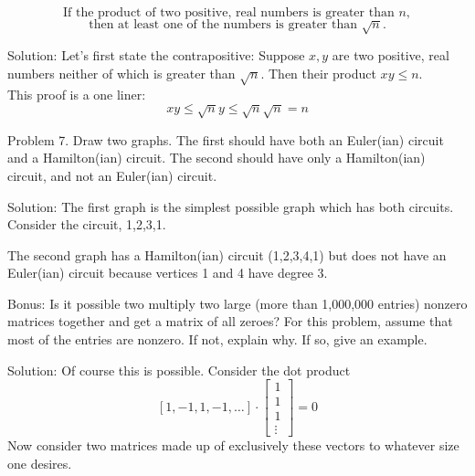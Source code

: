 \documentclass[16 pt]{amsart}
\theoremstyle{definition}
\theoremstyle{remark}
\numberwithin{equation}{subsection}
\begin{document}
\[
\text{If the product of two positive, real numbers is greater than } n,
\]
\[
\text{then at least one of the numbers is greater than } \sqrt{n}.
\]

\vspace{1in}

Solution: Let's first state the contrapositive: Suppose $x,y$ are two positive, real numbers neither of which is greater than $\sqrt{n}$.  Then their product $xy\le n$.\\

This proof is a one liner:
\[
xy \le \sqrt{n}y \le \sqrt{n}\sqrt{n} =n
\]



\newpage

Problem 7. Draw two graphs.  The first should have both an Euler(ian) circuit and a Hamilton(ian) circuit.  The second should have only a Hamilton(ian) circuit, and not an Euler(ian) circuit.
\vspace{1in}

Solution: The first graph is the simplest possible graph which has both circuits.  Consider the circuit, 1,2,3,1.


\vspace{.5in}

The second graph has a Hamilton(ian) circuit (1,2,3,4,1) but does not have an Euler(ian) circuit because vertices 1 and 4 have degree 3.


\newpage

Bonus: Is it possible two multiply two large (more than 1,000,000 entries) nonzero matrices together and get a matrix of all zeroes?  For this problem, assume that most of the entries are nonzero.  If not, explain why.  If so, give an example.


\vspace{1in}

Solution: Of course this is possible.  Consider the dot product 
\[
[1,-1,1,-1,\dots] \cdot 
\begin{bmatrix}
1\\1\\1\\ \vdots 
\end{bmatrix} = 0
\]
Now consider two matrices made up of exclusively these vectors to whatever size one desires.
\end{document}
